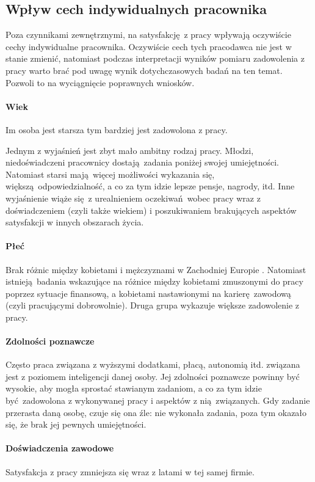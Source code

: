 \subsection{Wpływ cech indywidualnych pracownika}
\label{sec:theory-sat-age}
Poza czynnikami zewnętrznymi, na satysfakcję z pracy wpływają oczywiście cechy indywidualne pracownika. Oczywiście cech tych pracodawca nie jest w stanie zmienić, natomiast podczas interpretacji wyników pomiaru zadowolenia z pracy warto brać pod uwagę wynik dotychczasowych badań na ten temat. Pozwoli to na wyciągnięcie poprawnych wniosków.

\paragraph{Wiek} Im osoba jest starsza tym bardziej jest zadowolona z pracy. 

Jednym z wyjaśnień jest zbyt mało ambitny rodzaj pracy. Młodzi, niedoświadczeni pracownicy dostają zadania poniżej swojej umiejętności. Natomiast starsi mają więcej możliwości wykazania się, większą odpowiedzialność, a co za tym idzie lepsze pensje, nagrody, itd. Inne wyjaśnienie wiąże się z urealnieniem oczekiwań wobec pracy wraz z doświadczeniem (czyli
także wiekiem) i poszukiwaniem brakujących aspektów satysfakcji w innych obszarach życia.
\paragraph{Płeć} Brak różnic między kobietami i mężczyznami w Zachodniej Europie \cite{de1991gender}. Natomiast istnieją badania wskazujące na różnice między kobietami zmuszonymi do pracy poprzez sytuacje finansową, a kobietami nastawionymi na karierę zawodową (czyli pracującymi dobrowolnie). Druga grupa wykazuje większe zadowolenie z pracy.
\paragraph{Zdolności poznawcze} Często praca związana z wyższymi dodatkami, płacą, autonomią itd. związana jest z poziomem inteligencji danej osoby. Jej zdolności poznawcze powinny być wysokie, aby mogła sprostać stawianym zadaniom, a co za tym idzie być zadowolona z wykonywanej pracy i aspektów z nią związanych. Gdy zadanie przerasta daną osobę, czuje się ona źle: nie wykonała zadania, poza tym okazało się, że brak jej pewnych umiejętności.
\paragraph{Doświadczenia zawodowe} Satysfakcja z pracy zmniejsza się wraz z latami w tej samej firmie. 

